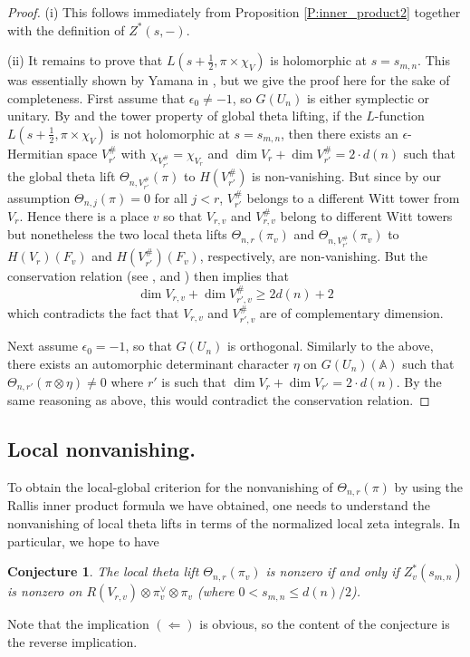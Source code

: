 \documentclass[10pt]{amsart}
\theoremstyle{plain}
\newtheorem{Conj}[equation]{Conjecture}
\numberwithin{equation}{section}
\begin{document}
\begin{proof}
(i)  This follows immediately  from Proposition \ref{P:inner_product2}
together with the definition of $Z^*(s,-)$.
 

 
\vskip 5pt

\noindent (ii) It remains to prove that
$L(s+ \frac{1}{2},\pi \times \chi_V)$ is holomorphic at $s =
s_{m,n}$. This was essentially shown by Yamana in \cite[Lemma
10.1]{Y4}, but we give the proof here for the sake of completeness.
First assume that $\epsilon_0\neq -1$, so $G(U_n)$ is either symplectic or
unitary. By \cite[Theorem 10.1 (2)]{Y4} and the tower property of global theta
lifting, if the $L$-function $L(s +\frac{1}{2}, \pi \times \chi_V)$ is not holomorphic
at $s=s_{m,n}$, then there exists an $\epsilon$-Hermitian space
$V^{\#}_{r'}$ with $\chi_{V^\#_{r'}}=\chi_{V_r}$ and $\dim V_r+\dim V^{\#}_{r'}=2 \cdot d(n)$ such
that the global theta lift $\Theta_{n, V^{\#}_{r'}}(\pi)$ to
$H(V_{r'}^{\#})$ is non-vanishing. 
But since by our assumption
$\Theta_{n,j}(\pi)=0$ for all $j<r$, $V^{\#}_{r'}$ belongs to a
different Witt tower from $V_{r}$. Hence there is a place $v$ so that
$V_{r,v}$ and $V_{r,v}^{\#}$ belong to different Witt towers but
nonetheless the two local theta lifts $\Theta_{n,r}(\pi_v)$ and $\Theta_{n,
  V^{\#}_{r'}}(\pi_v)$ to $H(V_r)(F_v)$ and $H(V^{\#}_{r'})(F_v)$, respectively, are
  non-vanishing. But the conservation relation (see \cite{KR6}, \cite[Thm. 5.4]{GI2} and \cite{SZ}) 
  then implies that
\[ \dim V_{r,v}+\dim V^{\#}_{r',v}\geq 2d(n)+2 \]
which contradicts the fact that $V_{r,v}$ and $V^{\#}_{r',v}$ are of complementary dimension.
\vskip 5pt

Next assume $\epsilon_0=-1$, so that  $G(U_n)$ is orthogonal. Similarly to
the above, there exists an automorphic determinant character $\eta$ on
$G(U_n)({\mathbb{A}})$ such that $\Theta_{n,r'}(\pi\otimes\eta)\neq 0$ where $r'$
is such that $\dim V_r+\dim V_{r'}=2 \cdot d(n)$. By the same reasoning
as above, this would contradict the conservation relation.
 \vskip 5pt

\end{proof}
 
  \vskip 5pt
   
 
 \subsection{\bf Local nonvanishing.}
 To obtain the local-global criterion for the nonvanishing of
 $\Theta_{n,r}(\pi)$ by using the Rallis inner product formula we have
 obtained, one needs to understand the nonvanishing of local theta
 lifts in terms of the normalized local zeta integrals. In particular,
 we hope to have
\begin{Conj} \label{C:localnon0}
 The local theta lift $\Theta_{n,r}(\pi_v)$ is nonzero if and only if
 $Z_v^*(s_{m,n})$ is nonzero on $R(V_{r,v}) \otimes \pi_v^{\vee} \otimes
 \pi_v$ (where $0 < s_{m,n} \leq  d(n)/2$).
 \end{Conj}
 Note that the implication $(\Longleftarrow)$ is obvious, so  the
 content of the conjecture is the reverse implication. 
 \vskip 5pt
 
\end{document}
